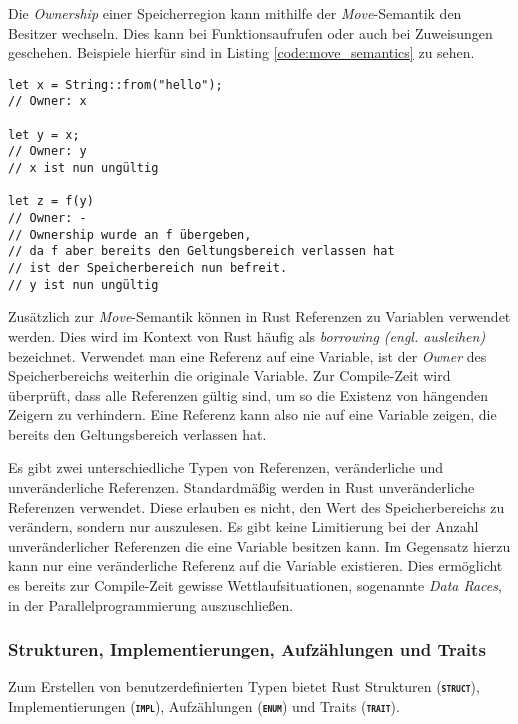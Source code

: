 Die \textit{Ownership} einer Speicherregion kann mithilfe der \textit{Move}-Semantik den Besitzer wechseln.
Dies kann bei Funktionsaufrufen oder auch bei Zuweisungen geschehen. Beispiele hierfür sind in Listing
\ref{code:move_semantics} zu sehen.\cite{rustBook}

\begin{lstlisting}[float,caption={Beispieldarstellung der \textit{Move}-Semantik},label=code:move_semantics]
let x = String::from("hello");
// Owner: x

let y = x;
// Owner: y
// x ist nun ungültig

let z = f(y) 
// Owner: -
// Ownership wurde an f übergeben,
// da f aber bereits den Geltungsbereich verlassen hat
// ist der Speicherbereich nun befreit.
// y ist nun ungültig
\end{lstlisting}

Zusätzlich zur \textit{Move}-Semantik können in Rust Referenzen zu Variablen verwendet werden. Dies wird im Kontext
von Rust häufig als \textit{borrowing (engl. ausleihen)} bezeichnet. Verwendet man eine Referenz auf eine Variable,
ist der \textit{Owner} des Speicherbereichs weiterhin die originale Variable.
Zur Compile-Zeit wird überprüft, dass alle Referenzen gültig sind, um so die Existenz von hängenden Zeigern
zu verhindern. Eine Referenz kann also nie auf eine Variable zeigen, die bereits den Geltungsbereich verlassen hat.
\cite{rustBook}

Es gibt zwei unterschiedliche
Typen von Referenzen, veränderliche und unveränderliche Referenzen. Standardmäßig werden in Rust unveränderliche
Referenzen verwendet. Diese erlauben es nicht, den Wert des Speicherbereichs zu verändern, sondern nur auszulesen.
Es gibt keine Limitierung bei der Anzahl unveränderlicher Referenzen die eine Variable besitzen kann. Im Gegensatz
hierzu kann nur eine veränderliche Referenz auf die Variable existieren. Dies ermöglicht es bereits zur
Compile-Zeit gewisse Wettlaufsituationen, sogenannte \textit{Data Races},
in der Parallelprogrammierung auszuschließen.\cite{rustBook}

\subsubsection{Strukturen, Implementierungen, Aufzählungen und Traits}

Zum Erstellen von benutzerdefinierten Typen bietet Rust Strukturen (\texttt{\textsc{\textbf{struct}}}),
Implementierungen (\texttt{\textsc{\textbf{impl}}}), Aufzählungen (\texttt{\textsc{\textbf{enum}}}) und
Traits (\texttt{\textsc{\textbf{trait}}}).

